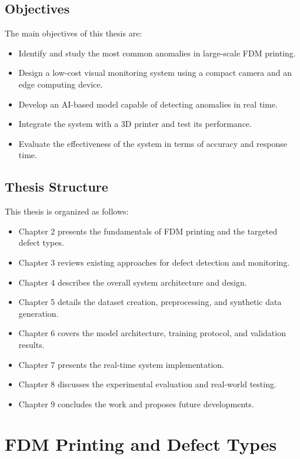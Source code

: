 \documentclass[english, Lau, oneside]{sapthesis}
\begin{document}
\section{Objectives}
The main objectives of this thesis are:
\begin{itemize}
\item Identify and study the most common anomalies in large-scale FDM printing.
\item Design a low-cost visual monitoring system using a compact camera and an edge computing device.
\item Develop an AI-based model capable of detecting anomalies in real time.
\item Integrate the system with a 3D printer and test its performance.
\item Evaluate the effectiveness of the system in terms of accuracy and response time.
\end{itemize}

\section{Thesis Structure}
This thesis is organized as follows:
\begin{itemize}
\item Chapter 2 presents the fundamentals of FDM printing and the targeted defect types.
\item Chapter 3 reviews existing approaches for defect detection and monitoring.
\item Chapter 4 describes the overall system architecture and design.
\item Chapter 5 details the dataset creation, preprocessing, and synthetic data generation.
\item Chapter 6 covers the model architecture, training protocol, and validation results.
\item Chapter 7 presents the real-time system implementation.
\item Chapter 8 discusses the experimental evaluation and real-world testing.
\item Chapter 9 concludes the work and proposes future developments.
\end{itemize}

\chapter{FDM Printing and Defect Types}
\label{chap:defects}
\end{document}

